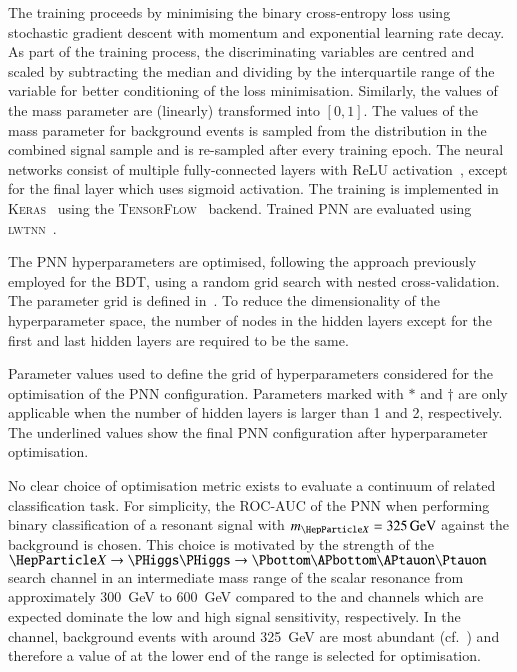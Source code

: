 The training proceeds by minimising the binary cross-entropy loss
using stochastic gradient descent with momentum and exponential
learning rate decay. As part of the training process, the
discriminating variables are centred and scaled by subtracting the
median and dividing by the interquartile range of the variable for
better conditioning of the loss minimisation. Similarly, the values of
the mass parameter are (linearly) transformed into $[0, 1]$. The
values of the mass parameter for background events is sampled from the
\mX distribution in the combined signal sample and is re-sampled after
every training epoch. The neural networks consist of multiple
fully-connected layers with ReLU activation~\cite{nair:relu}, except
for the final layer which uses sigmoid activation. The training is
implemented in \textsc{Keras}~\cite{keras} using the
\textsc{TensorFlow}~\cite{tensorflow2015-whitepaper} backend. Trained
PNN are evaluated using \textsc{lwtnn}~\cite{lwtnn}.

The PNN hyperparameters are optimised, following the approach
previously employed for the BDT, using a random grid search with
nested cross-validation. The parameter grid is defined
in~. To reduce the dimensionality of
the hyperparameter space, the number of nodes in the hidden layers
except for the first and last hidden layers are required to be the
same.

\begin{table}[htbp]
  \centering

  \caption{Parameter values used to define the grid of hyperparameters
    considered for the optimisation of the PNN
    configuration. Parameters marked with $*$ and $\dagger$ are only
    applicable when the number of hidden layers is larger than 1 and
    2, respectively. The underlined values show the final PNN
    configuration after hyperparameter optimisation.}%
  \label{tab:hyperparameter_grid_pnn}

  
\end{table}

No clear choice of optimisation metric exists to evaluate a continuum
of related classification task. For simplicity, the ROC-AUC of the PNN
when performing binary classification of a resonant signal with
$\mX = \SI{325}{\GeV}$ against the background is chosen. This choice
is motivated by the strength of the $\PX \to \HH \to \bbtautau$ search
channel in an intermediate mass range of the scalar resonance from
approximately \SI{300}{\GeV} to \SI{600}{\GeV} compared to the \bbyy
and \bbbb channels which are expected dominate the low and high \mX
signal sensitivity, respectively. In the \hadhad channel, background
events with \mHH around \SI{325}{\GeV} are most abundant
(cf.~) and therefore a value of \mX at the lower
end of the range is selected for optimisation.

